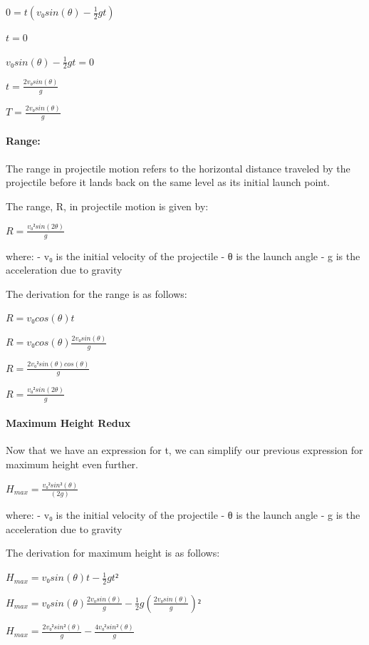 \documentclass[11pt]{article}
\begin{document}
\(0 = t (v₀ sin(θ) - \frac{1}{2} g t)\)

\(t = 0\)

\(v₀ sin(θ) - \frac{1}{2} g t = 0\)

\(t = \frac{2 v₀ sin(θ)}{g}\)

\(T = \frac{2 v₀ sin(θ)}{g}\)

    \hypertarget{range}{%
\paragraph{\texorpdfstring{\textbf{Range:}}{Range:}}\label{range}}

The range in projectile motion refers to the horizontal distance
traveled by the projectile before it lands back on the same level as its
initial launch point.

The range, R, in projectile motion is given by:

\(R = \frac{v₀² sin(2θ)}{g}\)

where: - v₀ is the initial velocity of the projectile - θ is the launch
angle - g is the acceleration due to gravity

The derivation for the range is as follows:

\(R = v₀ cos(θ) t\)

\(R = v₀ cos(θ) \frac{2v₀ sin(θ)}{g}\)

\(R = \frac{2v₀² sin(θ) cos(θ)}{g}\)

\(R = \frac{v₀² sin(2θ)}{g}\)

    \hypertarget{maximum-height-redux}{%
\paragraph{\texorpdfstring{\textbf{Maximum Height
Redux}}{Maximum Height Redux}}\label{maximum-height-redux}}

Now that we have an expression for t, we can simplify our previous
expression for maximum height even further.

\(H_{max} = \frac{v₀² sin²(θ)}{(2g)}\)

where: - v₀ is the initial velocity of the projectile - θ is the launch
angle - g is the acceleration due to gravity

The derivation for maximum height is as follows:

\(H_{max} = v₀ sin(θ) t - \frac{1}{2} g t²\)

\(H_{max} = v₀ sin(θ) \frac{2v₀ sin(θ)}{g} - \frac{1}{2} g (\frac{2v₀ sin(θ)}{g})²\)

\(H_{max} = \frac{2v₀² sin²(θ)}{g} - \frac{4v₀² sin²(θ)}{g}\)
\end{document}
